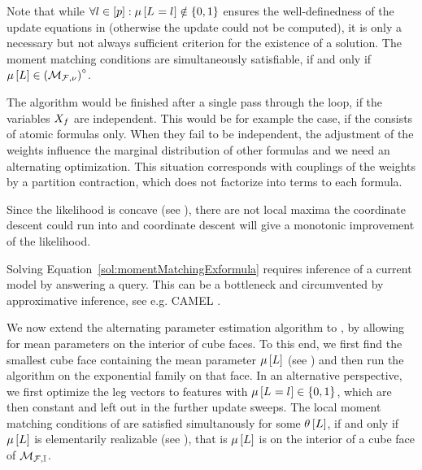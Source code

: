 Note that while $\forall{l\in[p]}:{\mu\left[L_{}=l_{}\right]\notin\{0,1\}}$ ensures the well-definedness of the update equations in  (otherwise the update could not be computed), it is only a necessary but not always sufficient criterion for the existence of a solution.
The moment matching conditions are simultaneously satisfiable, if and only if $\mu\left[L\right]\in{\left(\mathcal{M}_{\mathcal{F},\nu}\right)}^{\circ}$.


The algorithm would be finished after a single pass through the loop, if the variables $X_{f}$ are independent.
This would be for example the case, if the \MarkovLogicNetwork{} consists of atomic formulas only.
When they fail to be independent, the adjustment of the weights influence the marginal distribution of other formulas and we need an alternating optimization.
%
This situation corresponds with couplings of the weights by a partition contraction, which does not factorize into terms to each formula.

Since the likelihood is concave (see \cite{koller_probabilistic_2009}), there are not local maxima the coordinate descent could run into and coordinate descent will give a monotonic improvement of the likelihood.

Solving Equation~\ref{sol:momentMatchingExformula} requires inference of a current model by answering a query.
This can be a bottleneck and circumvented by approximative inference, see e.g. CAMEL \cite{ganapathi_constrained_2008}.

\subsubsect{\HybridLogicNetworks{}}

We now extend the alternating parameter estimation algorithm to \HybridLogicNetworks{}, by allowing for mean parameters on the interior of cube faces.
To this end, we first find the smallest cube face containing the mean parameter $\mu\left[L\right]$ (see ) and then run the algorithm on the exponential family on that face.
In an alternative perspective, we first optimize the leg vectors to features with $\mu\left[L_{}=l_{}\right]\in\{0,1\}$, which are then constant and left out in the further update sweeps.
The local moment matching conditions of are satisfied simultanously for some $\theta\left[L\right]$, if and only if $\mu\left[L\right]$ is elementarily realizable (see ), that is $\mu\left[L\right]$ is on the interior of a cube face of $\mathcal{M}_{\mathcal{F},\mathbb{I}}$.

